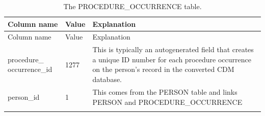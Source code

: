 \documentclass[11pt]{book}
\begin{document}
\begin{longtable}[]{@{}lll@{}}
\caption{\label{tab:procedureOccurrence} The PROCEDURE\_OCCURRENCE
table.}\tabularnewline
\toprule
\begin{minipage}[b]{0.28\columnwidth}\raggedright\strut
Column name\strut
\end{minipage} & \begin{minipage}[b]{0.16\columnwidth}\raggedright\strut
Value\strut
\end{minipage} & \begin{minipage}[b]{0.48\columnwidth}\raggedright\strut
Explanation\strut
\end{minipage}\tabularnewline
\midrule
\endfirsthead
\toprule
\begin{minipage}[b]{0.28\columnwidth}\raggedright\strut
Column name\strut
\end{minipage} & \begin{minipage}[b]{0.16\columnwidth}\raggedright\strut
Value\strut
\end{minipage} & \begin{minipage}[b]{0.48\columnwidth}\raggedright\strut
Explanation\strut
\end{minipage}\tabularnewline
\midrule
\endhead
\begin{minipage}[t]{0.28\columnwidth}\raggedright\strut
procedure\_ occurrence\_id\strut
\end{minipage} & \begin{minipage}[t]{0.16\columnwidth}\raggedright\strut
1277\strut
\end{minipage} & \begin{minipage}[t]{0.48\columnwidth}\raggedright\strut
This is typically an autogenerated field that creates a unique ID number
for each procedure occurrence on the person's record in the converted
CDM database.\strut
\end{minipage}\tabularnewline
\begin{minipage}[t]{0.28\columnwidth}\raggedright\strut
person\_id\strut
\end{minipage} & \begin{minipage}[t]{0.16\columnwidth}\raggedright\strut
1\strut
\end{minipage} & \begin{minipage}[t]{0.48\columnwidth}\raggedright\strut
This comes from the PERSON table and links PERSON and
PROCEDURE\_OCCURRENCE\strut
\end{minipage}\tabularnewline
\begin{minipage}[t]{0.28\columnwidth}\raggedright\strut

\end{minipage}
\end{longtable}
\end{document}
